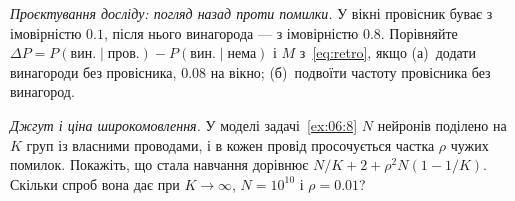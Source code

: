 \begin{exercise}[\lvlB]
\label{ex:07:7}
\emph{Проєктування досліду: погляд назад проти помилки.} У вікні провісник буває з імовірністю $0.1$, після нього винагорода --- з імовірністю $0.8$. Порівняйте $\Delta P=P(\text{вин.}\mid\text{пров.})-P(\text{вин.}\mid\text{нема})$ і $M$ з~\eqref{eq:retro}, якщо (а)~додати винагороди без провісника, $0.08$ на вікно; (б)~подвоїти частоту провісника без винагород.
\end{exercise}

\begin{exercise}[\lvlC]
\label{ex:07:8}
\emph{Джгут і ціна широкомовлення.} У моделі задачі~\ref{ex:06:8} $N$ нейронів поділено на $K$ груп із власними проводами, і в кожен провід просочується частка $\rho$ чужих помилок. Покажіть, що стала навчання дорівнює $N/K+2+\rho^2N(1-1/K)$. Скільки спроб вона дає при $K\to\infty$, $N=10^{10}$ і $\rho=0.01$?
\end{exercise}

